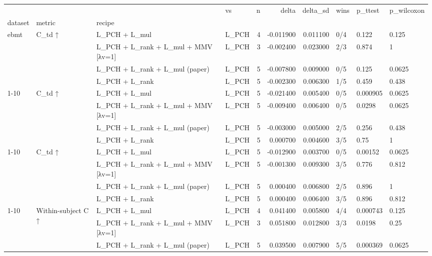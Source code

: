 \begin{tabular}{llllrrrlll}
\toprule
 &  &  & vs & n & delta & delta\_sd & wins & p\_ttest & p\_wilcoxon \\
dataset & metric & recipe &  &  &  &  &  &  &  \\
\midrule
\multirow[t]{4}{*}{ebmt} & \multirow[t]{4}{*}{C\_td ↑} & L\_PCH + L\_mul & L\_PCH & 4 & -0.011900 & 0.011100 & 0/4 & 0.122 & 0.125 \\
 &  & L\_PCH + L\_rank + L\_mul + MMV [λv=1] & L\_PCH & 3 & -0.002400 & 0.023000 & 2/3 & 0.874 & 1 \\
 &  & L\_PCH + L\_rank + L\_mul (paper) & L\_PCH & 5 & -0.007800 & 0.009000 & 0/5 & 0.125 & 0.0625 \\
 &  & L\_PCH + L\_rank & L\_PCH & 5 & -0.002300 & 0.006300 & 1/5 & 0.459 & 0.438 \\
\cline{1-10} \cline{2-10}
\multirow[t]{4}{*}{hsa\_synthetic} & \multirow[t]{4}{*}{C\_td ↑} & L\_PCH + L\_mul & L\_PCH & 5 & -0.021400 & 0.005400 & 0/5 & 0.000905 & 0.0625 \\
 &  & L\_PCH + L\_rank + L\_mul + MMV [λv=1] & L\_PCH & 5 & -0.009400 & 0.006400 & 0/5 & 0.0298 & 0.0625 \\
 &  & L\_PCH + L\_rank + L\_mul (paper) & L\_PCH & 5 & -0.003000 & 0.005000 & 2/5 & 0.256 & 0.438 \\
 &  & L\_PCH + L\_rank & L\_PCH & 5 & 0.000700 & 0.004600 & 3/5 & 0.75 & 1 \\
\cline{1-10} \cline{2-10}
\multirow[t]{4}{*}{sim\_base} & \multirow[t]{4}{*}{C\_td ↑} & L\_PCH + L\_mul & L\_PCH & 5 & -0.012900 & 0.003700 & 0/5 & 0.00152 & 0.0625 \\
 &  & L\_PCH + L\_rank + L\_mul + MMV [λv=1] & L\_PCH & 5 & -0.001300 & 0.009300 & 3/5 & 0.776 & 0.812 \\
 &  & L\_PCH + L\_rank + L\_mul (paper) & L\_PCH & 5 & 0.000400 & 0.006800 & 2/5 & 0.896 & 1 \\
 &  & L\_PCH + L\_rank & L\_PCH & 5 & 0.000400 & 0.006400 & 3/5 & 0.896 & 0.812 \\
\cline{1-10} \cline{2-10}
\multirow[t]{4}{*}{ebmt} & \multirow[t]{4}{*}{Within-subject C ↑} & L\_PCH + L\_mul & L\_PCH & 4 & 0.041400 & 0.005800 & 4/4 & 0.000743 & 0.125 \\
 &  & L\_PCH + L\_rank + L\_mul + MMV [λv=1] & L\_PCH & 3 & 0.051800 & 0.012800 & 3/3 & 0.0198 & 0.25 \\
 &  & L\_PCH + L\_rank + L\_mul (paper) & L\_PCH & 5 & 0.039500 & 0.007900 & 5/5 & 0.000369 & 0.0625 \\

\end{tabular}
